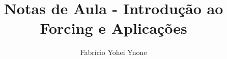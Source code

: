 \documentclass[12pt, a4paper]{book}
\title{Notas de Aula - Introdução ao Forcing e Aplicações}
\author{Fabrício Yohei Ynone}
\date{}
\begin{document}
\maketitle 
\tableofcontents


\newpage
\nocite{*}


\end{document}
